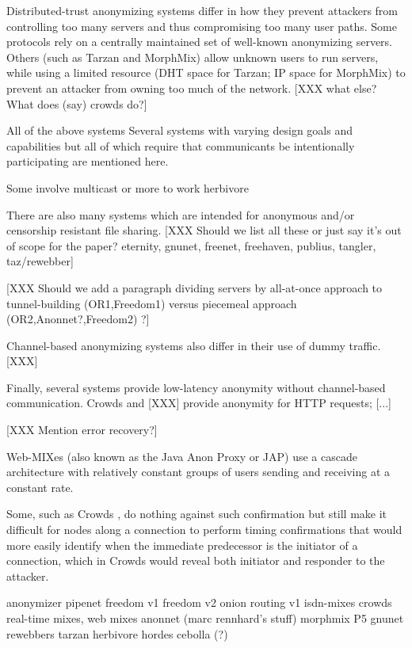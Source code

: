 \documentclass[times,10pt,twocolumn]{article}
\begin{document}
Distributed-trust anonymizing systems differ in how they prevent attackers
from controlling too many servers and thus compromising too many user paths.
Some protocols rely on a centrally maintained set of well-known anonymizing
servers.  Others (such as Tarzan and MorphMix) allow unknown users to run
servers, while using a limited resource (DHT space for Tarzan; IP space for
MorphMix) to prevent an attacker from owning too much of the network.
[XXX what else?  What does (say) crowds do?]

All of the above systems  Several systems with varying design goals
and capabilities but all of which require that communicants be
intentionally participating are mentioned here.

Some involve multicast or more to work
herbivore

There are also many systems which are intended for anonymous
and/or censorship resistant file sharing. [XXX Should we list all these
or just say it's out of scope for the paper?
eternity, gnunet, freenet, freehaven, publius, tangler, taz/rewebber]



[XXX Should we add a paragraph dividing servers by all-at-once approach to
  tunnel-building (OR1,Freedom1) versus piecemeal approach
  (OR2,Anonnet?,Freedom2) ?]



Channel-based anonymizing systems also differ in their use of dummy traffic.
[XXX]

Finally, several systems provide low-latency anonymity without channel-based
communication.  Crowds and [XXX] provide anonymity for HTTP requests; [...]

[XXX Mention error recovery?]

Web-MIXes \cite{web-mix} (also known as the Java Anon Proxy or JAP)
use a cascade architecture with relatively constant groups of users
sending and receiving at a constant rate.

Some, such as Crowds \cite{crowds-tissec}, do nothing against such
confirmation but still make it difficult for nodes along a connection to
perform timing confirmations that would more easily identify when
the immediate predecessor is the initiator of a connection, which in
Crowds would reveal both initiator and responder to the attacker.


anonymizer
pipenet
freedom v1
freedom v2
onion routing v1
isdn-mixes
crowds
real-time mixes, web mixes
anonnet (marc rennhard's stuff)
morphmix
P5
gnunet
rewebbers
tarzan
herbivore
hordes
cebolla (?)
\end{document}
